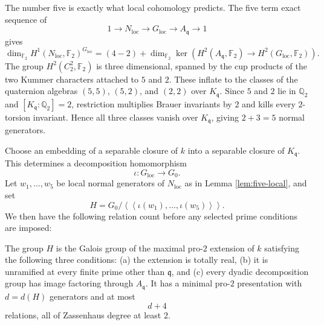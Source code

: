 \begin{remark}\label{rem:local-count}
The number five is exactly what local cohomology predicts.  The five term exact sequence of
\[
   1\longrightarrow N_{\mathrm{loc}}\longrightarrow G_{\mathrm{loc}}\longrightarrow A_{\mathfrak{q}}\longrightarrow1
\]
gives
\[
\dim_{\mathbb{F}_2}H^1(N_{\mathrm{loc}},\mathbb{F}_2)^{G_{\mathrm{loc}}}
=(4-2)+\dim_{\mathbb{F}_2}\ker\left(H^2(A_{\mathfrak{q}},\mathbb{F}_2)\to H^2(G_{\mathrm{loc}},\mathbb{F}_2)\right).
\]
The group $H^2(C_2^2,\mathbb{F}_2)$ is three dimensional, spanned by the cup products of the two Kummer characters attached to $5$ and $2$.  These inflate to the classes of the quaternion algebras $(5,5)$, $(5,2)$, and $(2,2)$ over $K_{\mathfrak{q}}$.  Since $5$ and $2$ lie in $\mathbb{Q}_2$ and $[K_{\mathfrak{q}}:\mathbb{Q}_2]=2$, restriction multiplies Brauer invariants by $2$ and kills every $2$-torsion invariant.  Hence all three classes vanish over $K_{\mathfrak{q}}$, giving $2+3=5$ normal generators.
\end{remark}

Choose an embedding of a separable closure of $k$ into a separable closure of $K_{\mathfrak{q}}$.  This determines a decomposition homomorphism
\[
   \iota:G_{\mathrm{loc}}\longrightarrow G_0.
\]
Let $w_1,\dots,w_5$ be local normal generators of $N_{\mathrm{loc}}$ as in Lemma \ref{lem:five-local}, and set
\begin{equation}\label{eq:H-def}
   H=G_0/\left\langle\!\left\langle\iota(w_1),\dots,\iota(w_5)\right\rangle\!\right\rangle.
\end{equation}
We then have the following relation count before any selected prime conditions are imposed:

\begin{proposition}\label{prop:preselected}
The group $H$ is the Galois group of the maximal pro-$2$ extension of $k$ satisfying the following three conditions: (a) the extension is totally real, (b) it is unramified at every finite prime other than $\mathfrak{q}$, and (c) every dyadic decomposition group has image factoring through $A_{\mathfrak{q}}$.  It has a minimal pro-$2$ presentation with $d=d(H)$ generators and at most
\[
   d+4
\]
relations, all of Zassenhaus degree at least $2$.
\end{proposition}

